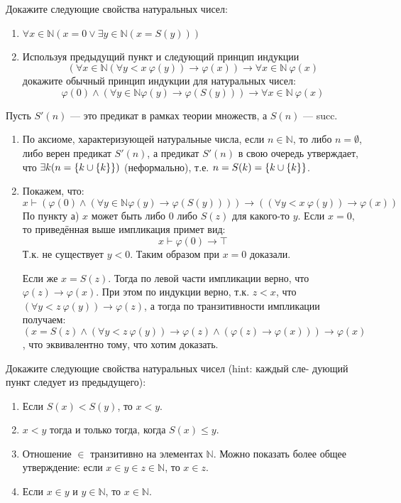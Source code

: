 \begin{task}[3]
Докажите следующие свойства натуральных чисел:
\begin{enumerate}
	\item $\forall x \in \mathbb{\mathbb{N}} (x = 0 \lor \exists y \in \mathbb{\mathbb{N}} (x = S(y)))$
	\item Используя предыдущий пункт и следующий принцип индукции
	\[
		(\forall x \in \mathbb{\mathbb{N}} (\forall y < x\ \varphi(y)) \to \varphi(x)) \to \forall x \in \mathbb{\mathbb{N}}\ \varphi(x)
	\]
	докажите обычный принцип индукции для натуральных чисел:
	\[
		\varphi(0) \land (\forall y \in \mathbb{\mathbb{N}} \varphi(y) \to \varphi(S(y))) \to \forall x \in \mathbb{\mathbb{N}}\ \varphi(x)
	\]
\end{enumerate}
\end{task}
\begin{solution}
Пусть $S'(n)$ --- это предикат в рамках теории множеств, а $S(n)$ --- succ.
\begin{enumerate}
	\item По аксиоме, характеризующей натуральные числа, если $n \in \mathbb{\mathbb{N}}$, то либо $n = \emptyset$, либо верен предикат $S'(n)$, а предикат $S'(n)$ в свою очередь утверждает, что $\exists k (n = \left\lbrace k \cup \left\lbrace k \right\rbrace \right\rbrace)$ (неформально), т.е. $n = S(k) = \left\lbrace k \cup \left\lbrace k \right\rbrace \right\rbrace$. \xqed

	\item Покажем, что:
	\[
		x \vdash (\varphi(0) \land (\forall y \in \mathbb{\mathbb{N}} \varphi(y) \to \varphi(S(y)))) \to 
		((\forall y < x\ \varphi(y)) \to \varphi(x))
	\]
	По пункту а) $x$ может быть либо $0$ либо $S(z)$ для какого-то $y$. Если $x = 0$, то приведённая выше импликация примет вид:
	\[
		x \vdash \varphi(0) \to \top
	\]
	Т.к. не существует $y < 0$. Таким образом при $x = 0$ доказали.

	Если же $x = S(z)$. Тогда по левой части импликации верно, что $\varphi(z) \to \varphi(x)$. При этом по индукции верно, т.к. $z < x$, что $(\forall y < z\ \varphi(y)) \to \varphi(z)$, а тогда по транзитивности импликации получаем: $(x = S(z) \land (\forall y < z\ \varphi(y)) \to \varphi(z) \land (\varphi(z) \to \varphi(x))) \to \varphi(x)$, что эквивалентно тому, что хотим доказать.
	\xqed 
\end{enumerate}
\end{solution}

\begin{task}[4]
Докажите следующие свойства натуральных чисел (hint: каждый сле-
дующий пункт следует из предыдущего):
\begin{enumerate}
\item Если $S(x) < S(y)$, то $x < y$.
\item $x < y$ тогда и только тогда, когда $S(x) ≤ y$.
\item Отношение $\in$ транзитивно на элементах $\mathbb{N}$. Можно показать более
общее утверждение: если $x \in y \in z \in \mathbb{N}$, то $x \in z$.
\item Если $x \in y$ и $y \in \mathbb{N}$, то $x \in \mathbb{N}$.
\end{enumerate}
\end{task}

